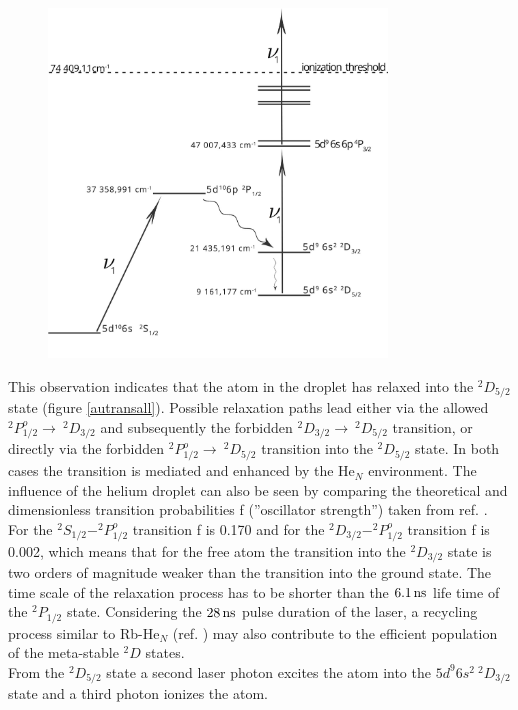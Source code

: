 \documentclass[parskip,12pt,headsepline,a4paper] {scrbook}
\begin{document}
\begin{figure}[h!t]
\centerline{
\includegraphics[width=9cm]{./results/au_trans.jpg}}
\end{figure}
This observation indicates that the atom in the droplet has relaxed into the $^2D_{5/2}$ state (figure \ref{autransall}). Possible relaxation paths lead either via the allowed $^2P^o_{1/2} \rightarrow \ ^2D_{3/2}$ and subsequently the forbidden $^2D_{3/2} \rightarrow \ ^2D_{5/2}$ transition, or directly via the forbidden $^2P^o_{1/2} \rightarrow \ ^2D_{5/2}$ transition into the $^2D_{5/2}$ state. In both cases the transition is mediated and enhanced by the He$_N$ environment. The influence of the helium droplet can also be seen by comparing the theoretical and dimensionless transition probabilities f (''oscillator strength'') taken from ref. \cite{fivet}. For the $^2S_{1/2} - ^2P^o_{1/2}$ transition f is 0.170 and for the $^2D_{3/2} - ^2P^o_{1/2}$ transition f is 0.002, which means that for the free atom the transition into the $^2D_{3/2}$ state is two orders of magnitude weaker than the transition into the ground state. The time scale of the relaxation process has to be shorter than the $\unit[6.1]{ns}$ life time of the $^2P_{1/2}$ state. Considering the $\unit[28]{ns}$ pulse duration of the laser, a recycling process similar to Rb-He$_N$ (ref. \cite{aubock}) may also contribute to the efficient population of the meta-stable $^2D$ states. \\
From the $^2D_{5/2}$ state a second laser photon excites the atom into the $5d^9 6s^2 \ ^2D_{3/2}$ state and a third photon ionizes the atom.
\end{document}

